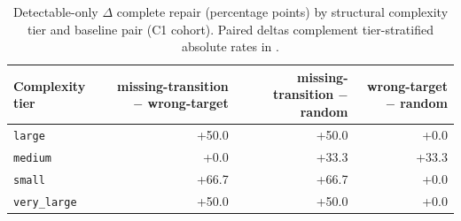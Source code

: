 \begin{table}[t]
\caption{Detectable-only $\Delta$ complete repair (percentage points) by structural complexity tier and baseline pair (C1 cohort). Paired deltas complement tier-stratified absolute rates in .}
\label{tab:baseline-delta-by-tier}
\begin{tabular}{@{}lrrr@{}}
\toprule
Complexity tier & missing-transition $-$ wrong-target & missing-transition $-$ random & wrong-target $-$ random \\
\midrule
\texttt{large} & +50.0 & +50.0 & +0.0 \\
\texttt{medium} & +0.0 & +33.3 & +33.3 \\
\texttt{small} & +66.7 & +66.7 & +0.0 \\
\texttt{very\_large} & +50.0 & +50.0 & +0.0 \\
\bottomrule
\end{tabular}
\end{table}
